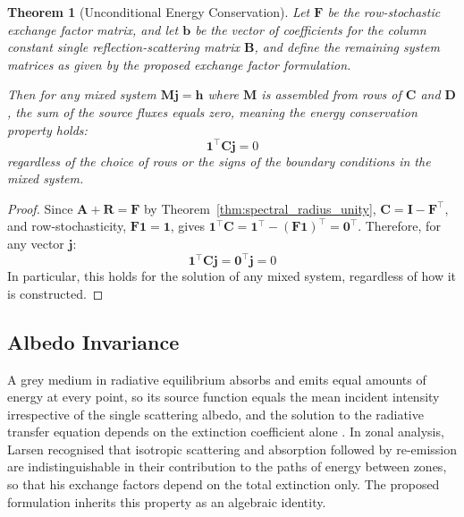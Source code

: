 \documentclass[preprint,1p,times]{elsarticle}
\theoremstyle{plain}
\newtheorem{theorem}{Theorem}[section]
\theoremstyle{definition}
\theoremstyle{remark}
\begin{document}
\begin{theorem}[Unconditional Energy Conservation]\label{thm:unconditional_conservation}
Let $\mathbf{F}$ be the row-stochastic exchange factor matrix, and let $\mathbf{b}$ be the vector of coefficients for the column constant single reflection-scattering matrix $\mathbf{B}$, and define the remaining system matrices as given by the proposed exchange factor formulation.

Then for any mixed system $\mathbf{M}\mathbf{j} = \mathbf{h}$ where $\mathbf{M}$ is assembled from rows of $\mathbf{C}$ and $\mathbf{D}$, the sum of the source fluxes equals zero, meaning the energy conservation property holds:
\begin{equation}
\mathbf{1}^\top \mathbf{C} \mathbf{j} = 0
\end{equation}
regardless of the choice of rows or the signs of the boundary conditions in the mixed system.
\end{theorem}

\begin{proof}
Since $\mathbf{A} + \mathbf{R} = \mathbf{F}$ by Theorem~\ref{thm:spectral_radius_unity}, $\mathbf{C} = \mathbf{I} - \mathbf{F}^\top$, and row-stochasticity, $\mathbf{F}\mathbf{1} = \mathbf{1}$, gives $\mathbf{1}^\top \mathbf{C} = \mathbf{1}^\top - (\mathbf{F}\mathbf{1})^\top = \mathbf{0}^\top$. Therefore, for any vector $\mathbf{j}$:
\begin{equation}
\mathbf{1}^\top \mathbf{C}\mathbf{j} = \mathbf{0}^\top\mathbf{j} = 0
\end{equation}
In particular, this holds for the solution of any mixed system, regardless of how it is constructed.
\end{proof}

\subsection{Albedo Invariance}
\label{sec:albedo_invariance}

A grey medium in radiative equilibrium absorbs and emits equal amounts of energy at every point, so its source function equals the mean incident intensity irrespective of the single scattering albedo, and the solution to the radiative transfer equation depends on the extinction coefficient alone \citep{Modest2022}. In zonal analysis, Larsen \citep{Larsen1983} recognised that isotropic scattering and absorption followed by re-emission are indistinguishable in their contribution to the paths of energy between zones, so that his exchange factors depend on the total extinction only. The proposed formulation inherits this property as an algebraic identity.
\end{document}
